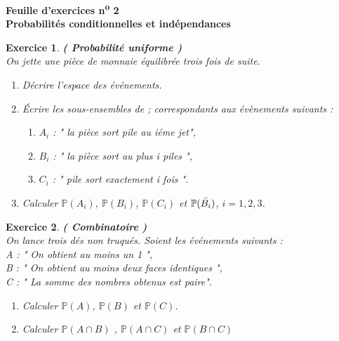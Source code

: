 \documentclass[12pt,a4paper]{article}
\newtheorem{exercice}{Exercice}
\begin{document}
\begin{center}{\Large\bfseries Feuille d'exercices n\textsuperscript{o} 2 \\[.2em]{\large Probabilités conditionnelles et indépendances }}\end{center}

\begin{exercice} \textbf{( Probabilité uniforme )} \\
On jette une pièce de monnaie équilibrée trois fois de suite.
\begin{enumerate}
    \item  Décrire l'espace des événements. 
    \item   Écrire les sous-ensembles de ; correspondants aux évènements suivants : 
    \begin{enumerate}
        \item $A_i$ : " la pièce sort pile au iéme jet", 
        \item $B_i$ : " la pièce sort au plus i piles ",
        \item $C_i$ : " pile sort exactement i fois ".
    \end{enumerate}
    \item  Calculer $\mathbb{P}(A_i)$, $\mathbb{P}(B_i)$, $\mathbb{P}(C_i)$ et $\mathbb{P}(\Bar{B_i})$,  $i=1 , 2, 3$. 
\end{enumerate}
    
\end{exercice}
\begin{exercice} \textbf{( Combinatoire )} \\
On lance trois dés non truqués. Soient les événements suivants : \\
A : " On obtient au moins un 1 ", \\
B : " On obtient au moins deux faces identiques ", \\
C : " La somme des nombres obtenus est paire".
\begin{enumerate}
    \item  Calculer $\mathbb{P}(A)$, $\mathbb{P}(B)$ et $\mathbb{P}(C)$. 
    \item  Calculer $\mathbb{P}(A \cap B)$ , $\mathbb{P}(A \cap C)$ et $\mathbb{P}(B \cap C)$
\end{enumerate}
    
\end{exercice}
\end{document}
